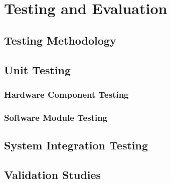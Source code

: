\chapter{Testing and Evaluation}
\label{chapter:testing}




\section{Testing Methodology}



\section{Unit Testing}


\subsection{Hardware Component Testing}



\subsection{Software Module Testing}



\section{System Integration Testing}



\section{Validation Studies}


